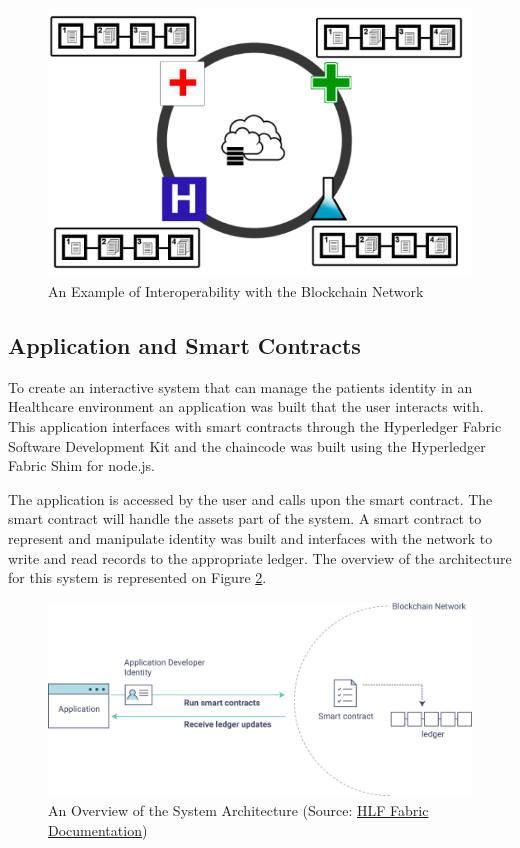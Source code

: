 \documentclass[]{llncs}
\begin{document}
\begin{figure}[ht]
\centering
\includegraphics[width=0.7\linewidth]{images/interoperability.png}
\caption{\label{fig:interoperability}An Example of Interoperability with the Blockchain Network}
\end{figure}

\subsection{Application and Smart Contracts}

To create an interactive system that can manage the patients identity in an Healthcare environment 
an application was built that the user interacts with. 
This application interfaces with smart contracts through the Hyperledger Fabric Software Development Kit
and the chaincode was built using the Hyperledger Fabric Shim for node.js.

The application is accessed by the user and calls upon the smart contract. 
The smart contract will handle the assets part of the system.
A smart contract to represent and manipulate identity was built and interfaces with the network 
to write and read records to the appropriate ledger. The overview of the architecture for this system is
represented on Figure \ref{fig:appOverview}.

\begin{figure}[ht]
\centering
\includegraphics[width=1\linewidth]{images/hyperledgerAppOverview.png}
\caption{\label{fig:appOverview}An Overview of the System Architecture (Source: \href{http://hyperledger-fabric.readthedocs.io/en/latest/write_first_app.html}{HLF Fabric Documentation})}
\end{figure}
\end{document}
